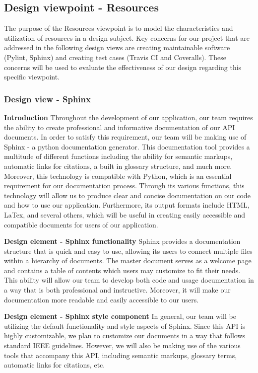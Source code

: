 \documentclass[onecolumn, draftclsnofoot,10pt, compsoc]{IEEEtran}
\begin{document}
\begin{flushleft}
\subsection{Design viewpoint - Resources}
The purpose of the Resources viewpoint is to model the characteristics and utilization of resources in a design subject. Key concerns for our project that are addressed in the following design views are creating maintainable software (Pylint, Sphinx) and creating test cases (Travis CI and Coveralls). These concerns will be used to evaluate the effectiveness of our design regarding this specific viewpoint.

\subsubsection{Design view - Sphinx}
\textbf{Introduction} Throughout the development of our application, our team requires the ability to create professional and informative documentation of our API documents.
In order to satisfy this requirement, our team will be making use of Sphinx - a python documentation generator. This documentation tool provides a multitude of different functions including the ability for  semantic markups, automatic links for citations, a built in glossary structure, and much more. \cite{17} Moreover, this technology is compatible with Python, which is an essential requirement for our documentation process.
Through its various functions, this technology will allow us to produce clear and concise documentation on our code and how to use our application. Furthermore, its output formats include HTML, LaTex, and several others, which will be useful in creating easily accessible and compatible documents for users of our application.

\medskip

\textbf{Design element - Sphinx functionality} Sphinx provides a documentation structure that is quick and easy to use, allowing its users to connect multiple files within a hierarchy of documents. The master document serves as a welcome page and contains a table of contents which users may customize to fit their needs. \cite{17} This ability will allow our team to develop both code and usage documentation in a way that is both professional and instructive. Moreover, it will make our documentation more readable and easily accessible to our users.

\medskip

\textbf{Design element - Sphinx style component}
In general, our team will be utilizing the default functionality and style aspects of Sphinx. Since this API is highly customizable, we plan to customize our documents in a way that follows standard IEEE guidelines. However, we will also be making use of the various tools that accompany this API, including semantic markups, glossary terms, automatic links for citations, etc. \cite{17}


\end{flushleft}
\end{document}
